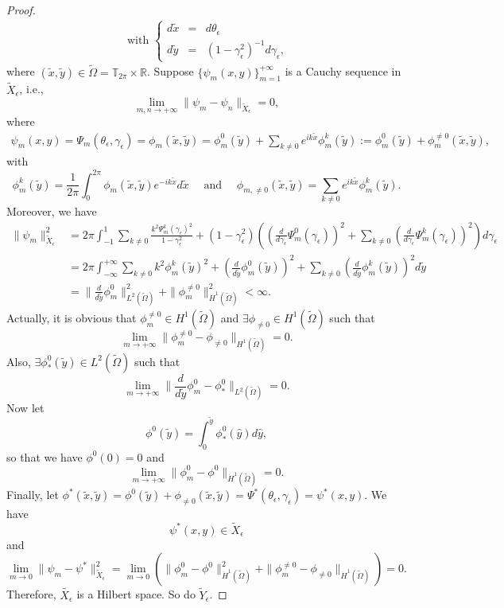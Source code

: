 \documentclass[1 [leqno, 11pt]{amsart}
\numberwithin{equation}{section}
\let\ep=\epsilon
\begin{document}
\begin{CJK*}{GBK}{song}
\begin{proof}
\begin{align}
\text{ with }
\left\{ \begin{array}{ccc} d\tilde{x}  & = & d\theta_\ep
\\ d\tilde{y}  & = & (1-\gamma_\ep^2)^{-1}d\gamma_\ep, \end{array} \right.
\end{align}
where $(\tilde{x}, \tilde{y}) \in \tilde{\Omega} = \mathbb{T}_{2\pi} \times \mathbb{R}$.
Suppose $\{\psi_m(x, y) \}_{m=1}^{+\infty}$ is a Cauchy sequence in $\tilde{X}_\ep$, i.e.,
$$\lim_{m,n \rightarrow +\infty}\|\psi_m - \psi_n\|_{\tilde{X}_\ep} = 0,$$
where
\begin{align}\label{decom-phi}
\psi_m(x,y) = \Psi_m(\theta_\ep, \gamma_\ep) = \phi_m(\tilde{x}, \tilde{y}) = \phi_m^0(\tilde{y}) + \sum_{k\neq0}e^{ik\tilde{x}}\phi_m^k(\tilde{y}) := \phi_m^0(\tilde{y}) + \phi_m^{\neq 0}(\tilde{x}, \tilde{y}),
\end{align}
with $$\phi_m^k(\tilde{y}) = \frac{1}{2\pi} \int_0^{2\pi} \phi_m(\tilde{x}, \tilde{y})e^{-ik\tilde{x}} d\tilde{x}\quad \text{ and } \quad \phi_{m,{\neq0}}(\tilde{x}, \tilde{y}) = \sum_{k\neq0}e^{ik\tilde{x}}\phi_m^k(\tilde{y}).$$
Moreover, we have
\begin{align}\label{norm-phi}
\|\psi_m\|^2_{\tilde{X}_\ep}
& =  2\pi \int_{-1}^{1} \sum_{k \neq 0} \frac{k^2 \Psi_m^k(\gamma_\ep)^2}{1-\gamma_\ep^2} + (1-\gamma_\ep^2) \left( \left(\frac{d}{d \gamma_\ep} \Psi^0_m(\gamma_\ep)\right)^2 + \sum_{k \neq 0}  \left(\frac{d}{d \gamma_\ep} \Psi^k_m(\gamma_\ep)\right)^2  \right) d \gamma_\ep \\
& = 2\pi \int_{-\infty}^{+\infty} \sum_{k \neq 0} k^2 \phi_m^k(\tilde{y})^2 + \left(\frac{d}{d \tilde{y}} \phi^0_m(\tilde{y})\right)^2 + \sum_{k \neq 0}  \left(\frac{d}{d \tilde{y}} \phi^k_m(\tilde{y})\right)^2   d \tilde{y} \\
& = \|\frac{d}{d \tilde{y}} \phi_m^0\|^2_{L^2(\tilde{\Omega})} + \|\phi^{\neq 0}_m\|^2_{\dot{H}^1(\tilde{\Omega})} < \infty.
\end{align}
Actually, it is obvious that $\phi^{\neq 0}_m \in H^1(\tilde{\Omega})$ and $\exists \phi_{\neq0} \in H^1(\tilde{\Omega})$ such that
$$\lim_{m\rightarrow +\infty} \|\phi^{\neq 0}_m -  \phi_{\neq0}\|_{H^1(\tilde{\Omega})} = 0.$$
Also, $\exists \phi^0_*(\tilde{y}) \in L^2(\tilde{\Omega})$ such that
$$\lim_{m\rightarrow +\infty}\| \frac{d}{d \tilde{y}} \phi_m^0 -  \phi^0_*\|_{L^2(\tilde{\Omega})} = 0.$$
Now let $$\phi^0(\tilde{y}) = \int_{0}^{\tilde{y}} \phi^0_*(\hat{y}) d\hat{y},$$
so that we have $\phi^0(0) = 0$ and
$$ \lim_{m\rightarrow +\infty}\| \phi^{0}_m -  \phi^{0}\|_{\dot{H}^1(\tilde{\Omega})} = 0. $$
Finally, let $\phi^*(\tilde{x}, \tilde{y}) = \phi^0(\tilde{y}) + \phi_{\neq0}(\tilde{x}, \tilde{y}) = \Psi^*(\theta_\ep, \gamma_\ep) = \psi^*(x,y)$. We have $$\psi^*(x,y) \in \tilde{X}_\ep$$ and
$$\lim_{m \rightarrow 0}\|\psi_m - \psi^*\|^2_{\tilde{X}_\ep} = \lim_{m \rightarrow 0}\left( \|\phi^0_m - \phi^0\|^2_{\dot{H}^1(\tilde{\Omega})} +  \| \phi^{\neq 0}_m -  \phi_{\neq0}\|_{\dot{H}^1(\tilde{\Omega})} \right) = 0.$$
Therefore, $\tilde{X_\ep}$ is a Hilbert space. So do $\tilde{Y}_\ep$.
\end{proof}
\fi


\end{CJK*}
\end{document}
